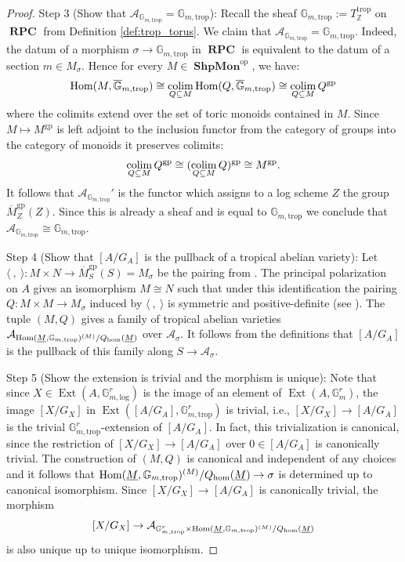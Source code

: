 \documentclass[11pt]{amsart}
\theoremstyle{definition}
\theoremstyle{remark}
\DeclareMathOperator{\Ext}{Ext}
\def\log{\mathrm{log}}
\def\hom{\mathrm{hom}}
\def\gp{\mathrm{gp}}
\def\op{\mathrm{op}}
\def\trop{\mathrm{trop}}
\DeclareMathOperator{\ShpMon}{\mathbf{ShpMon}}
\DeclareMathOperator{\RPC}{\mathbf{RPC}}
\def\colim{\qopname\relax m{colim}}
\DeclareMathOperator{\Hom}{\textup{Hom}}
\begin{document}
\begin{proof}
	Step 3 (Show that $\mathcal{A}_{\mathbb{G}_{m,\trop}}=\mathbb{G}_{m,\trop}$): Recall the sheaf $\mathbb{G}_{m,\trop}:=T_{\mathbb{Z}}^{\trop}$
	on $\RPC$ from Definition \ref{def:trop_torus}. We claim that $\mathcal{A}_{\mathbb{G}_{m,\trop}}=\mathbb{G}_{m,\trop}$. Indeed,
	the datum of a morphism $\sigma\to \mathbb{G}_{m,\trop}$ in $\RPC$ is equivalent to the datum of a
	section $m\in M_{\sigma}$. Hence for every $M\in \ShpMon^{\op}$, we have:
	$$\Hom(M,\overline{\mathbb{G}}_{m,\trop})\cong\colim_{Q\subseteq M}\Hom(Q,\overline{\mathbb{G}}_{m,\trop})\cong\colim_{Q\subseteq M}Q^{\gp}$$
	where the colimits extend over the set of toric monoids contained in $M$.
	Since $M\mapsto M^{\gp}$ is left adjoint to the inclusion functor
	from the category of groups into the category of monoids it
	preserves colimits:
	$$\colim_{Q\subseteq M}Q^{\gp}\cong (\colim_{Q\subseteq M}Q)^{\gp}\cong M^{\gp}.$$
	It follows that $\mathcal{A}_{\mathbb{G}_{m,\trop}}'$ is the
	functor which assigns to a log scheme $Z$ the group $\overline{M}_Z^{\gp}(Z)$.
	Since this is already a sheaf and is equal to $\mathbb{G}_{m,\trop}$
	we conclude that $\mathcal{A}_{\mathbb{G}_{m,\trop}}\cong \mathbb{G}_{m,\trop}$.

	Step 4 (Show that $[A/G_A]$ is the pullback of a tropical abelian variety):
	Let $\langle\ ,\ \rangle:M\times N\to \overline{M}_S^{\gp}(S)=M_{\sigma}$
	be the pairing from \cite[4.1.2 and 4.4]{LogarithmicAbeKajiwa2008}.
	The principal polarization on $A$ gives an isomorphism $M\cong N$
	such that under this identification
	the pairing $Q:M\times M\to M_{\sigma}$ induced by
	$\langle\ ,\ \rangle$ is symmetric and positive-definite
	(see \cite{LogarithmicAbeKajiwa2008}). The tuple $(M,Q)$ gives a family of tropical abelian varieties
	$\mathcal{A}_{\Hom(\underline{M},\mathbb{G}_{m,\trop})^{(M)}/Q_{\hom}(\underline{M})}$ over
	$\mathcal{A}_{\sigma}$. It follows from the definitions
	that $[A/G_A]$ is the pullback of this family
	along $S\to \mathcal{A}_{\sigma}$.

	Step 5 (Show the extension is trivial and the morphism is unique): Note that since $X\in \Ext(A,\mathbb{G}_{m,\log}^{r})$
	is the image of an element of $\Ext(A,\mathbb{G}_{m}^{r})$,
	the image $[X/G_X]$ in $\Ext([A/G_A],\mathbb{G}_{m,\trop}^{r})$
	is trivial, i.e., $[X/G_X]\to [A/G_A]$ is the trivial
	$\mathbb{G}_{m,\trop}^{r}$-extension of $[A/G_A]$. In fact,
	this trivialization is canonical, since the restriction
	of $[X/G_X]\to [A/G_A]$ over $0\in [A/G_A]$ is canonically trivial.
	The construction of $(M,Q)$ is canonical and independent
	of any choices and it follows that $\Hom(\underline{M},\mathbb{G}_{m,\trop})^{(M)}/Q_{\hom}(\underline{M})\to \sigma$ is determined
	up to canonical isomorphism. Since $[X/G_X]\to [A/G_A]$ is canonically trivial, the
	morphism
	$$[X/G_X]\to \mathcal{A}_{\mathbb{G}_{m,\trop}^{r}\times\Hom(\underline{M},\mathbb{G}_{m,\trop})^{(M)}/Q_{\hom}(\underline{M})}$$
	is also unique up to unique isomorphism.
\end{proof}
\end{document}
